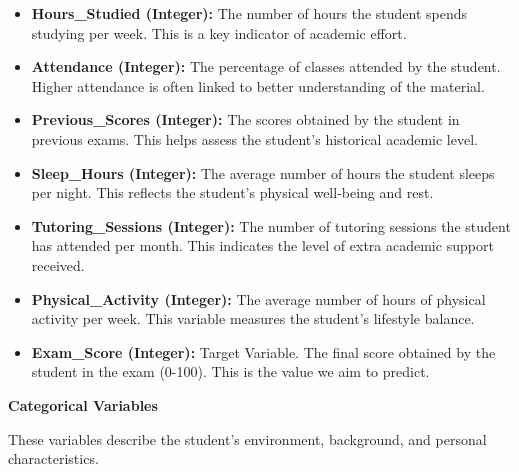 \documentclass[a4paper,12pt]{article}
\begin{document}
\begin{itemize}
    \item \textbf{Hours\_Studied (Integer):} The number of hours the student spends studying per week. This is a key indicator of academic effort.
    \item \textbf{Attendance (Integer):} The percentage of classes attended by the student. Higher attendance is often linked to better understanding of the material.
    \item \textbf{Previous\_Scores (Integer):} The scores obtained by the student in previous exams. This helps assess the student's historical academic level.
    \item \textbf{Sleep\_Hours (Integer):} The average number of hours the student sleeps per night. This reflects the student's physical well-being and rest.
    \item \textbf{Tutoring\_Sessions (Integer):} The number of tutoring sessions the student has attended per month. This indicates the level of extra academic support received.
    \item \textbf{Physical\_Activity (Integer):} The average number of hours of physical activity per week. This variable measures the student's lifestyle balance.
    \item \textbf{Exam\_Score (Integer):} Target Variable. The final score obtained by the student in the exam (0-100). This is the value we aim to predict.
\end{itemize}

\textbf{Categorical Variables}

These variables describe the student's environment, background, and personal characteristics.
\end{document}
